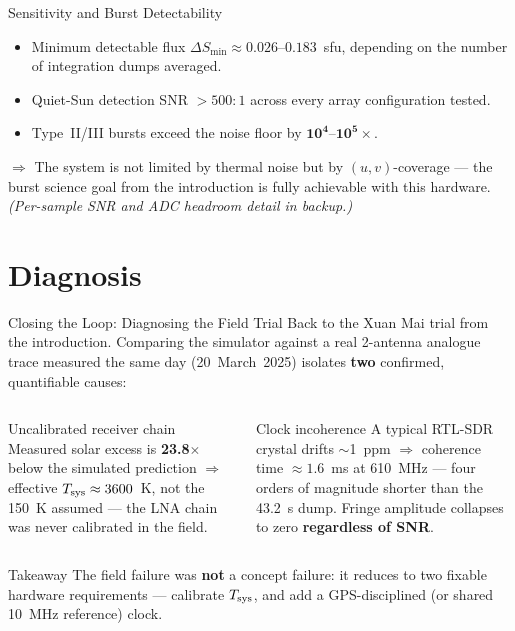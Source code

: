\documentclass{beamer}
\newcounter{sframe}[section]
\renewcommand{\thesframe}{\thesection.\arabic{sframe}}
\newcommand{\ftitle}[1]{\stepcounter{sframe}{\normalsize\thesframe}\quad #1}
\begin{document}
\begin{frame}{\ftitle{Sensitivity and Burst Detectability}}
\footnotesize
\begin{itemize}
  \setlength{\itemsep}{5pt}
  \item Minimum detectable flux $\Delta S_{\min}\approx0.026$--$0.183$~sfu,
  depending on the number of integration dumps averaged.
  \item Quiet-Sun detection SNR $>500{:}1$ across every array
  configuration tested.
  \item Type~II/III bursts exceed the noise floor by
  $\mathbf{10^{4}\text{--}10^{5}\times}$.
\end{itemize}
\vspace{6pt}
\small $\Rightarrow$ The system is not limited by thermal noise but by
$(u,v)$-coverage --- the burst science goal from the introduction is
fully achievable with this hardware. \emph{(Per-sample SNR and ADC
headroom detail in backup.)}
\end{frame}

\section{Diagnosis}

\begin{frame}{\ftitle{Closing the Loop: Diagnosing the Field Trial}}
\footnotesize
Back to the Xuan Mai trial from the introduction. Comparing the simulator
against a real 2-antenna analogue trace measured the same day
(20~March~2025) isolates \textbf{two} confirmed, quantifiable causes:
\vspace{4pt}
\begin{columns}[t]
\begin{block}{\centering Uncalibrated receiver chain}
\footnotesize
\centering
Measured solar excess is \textbf{23.8$\times$} below the simulated
prediction $\Rightarrow$ effective $T_{\rm sys}\approx3600$~K, not the
150~K assumed --- the LNA chain was never calibrated in the field.
\end{block}
\begin{block}{\centering Clock incoherence}
\footnotesize
\centering
A typical RTL-SDR crystal drifts $\sim$1~ppm $\Rightarrow$ coherence
time $\approx1.6$~ms at 610~MHz --- four orders of magnitude shorter
than the 43.2~s dump. Fringe amplitude collapses to zero
\textbf{regardless of SNR}.
\end{block}
\end{columns}
\vspace{8pt}
\begin{alertblock}{Takeaway}
\small The field failure was \textbf{not} a concept failure: it reduces
to two fixable hardware requirements --- calibrate $T_{\rm sys}$, and
add a GPS-disciplined (or shared 10~MHz reference) clock.
\end{alertblock}
\end{frame}
\end{document}
